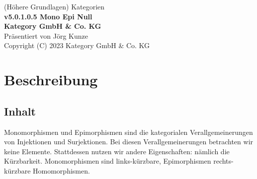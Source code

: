 \documentclass[a4paper]{amsart}
\theoremstyle{definition}
\begin{document}
\begin{titlepage}
\centering
{\huge
(Höhere Grundlagen) Kategorien\\[1cm]
\textbf{v5.0.1.0.5 Mono Epi Null}
}\\[1cm]

\textbf{Kategory GmbH \& Co. KG}\\
Präsentiert von Jörg Kunze\\
Copyright (C) 2023 Kategory GmbH \& Co. KG

\end{titlepage}

%

\newpage

\section*{Beschreibung}

\subsection*{Inhalt}
Monomorphismen und Epimorphismen sind die kategorialen Verallgemeinerungen von Injektionen und Surjektionen. Bei diesen Verallgemeinerungen betrachten wir keine Elemente. Stattdessen nutzen wir andere Eigenschaften: nämlich die Kürzbarkeit. Monomorphismen sind links-kürzbare, Epimorphismen rechts-kürzbare Homomorphismen.
\end{document}
